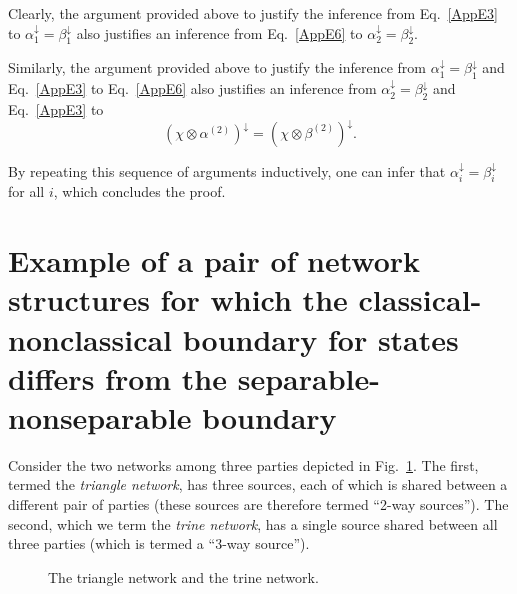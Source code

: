 \documentclass[prx,11pt,letterpaper,twocolumn,accepted=2023-11-27]{quantumarticle}
\newcommand{\bel}{\color{black}}
\theoremstyle{plain}
\theoremstyle{definition}
\begin{document}
\begin{appendices}
Clearly, the argument provided above to justify the inference from Eq.~\eqref{AppE3} to $\alpha^{\downarrow}_1 =\beta^{\downarrow}_1$ also justifies an inference from Eq.~\eqref{AppE6} to $\alpha^{\downarrow}_2 =\beta^{\downarrow}_2$.

Similarly, the argument provided above to justify the inference from $\alpha^{\downarrow}_1 =\beta^{\downarrow}_1$ and Eq.~\eqref{AppE3} to Eq.~\eqref{AppE6} also justifies an inference from $\alpha^{\downarrow}_2 =\beta^{\downarrow}_2$ and Eq.~\eqref{AppE3} to 
\begin{equation}\label{AppE8}
(\chi \otimes \alpha^{(2)})^{\downarrow}= (\chi \otimes \beta^{(2)})^{\downarrow}.
\end{equation}

By repeating this sequence of arguments inductively, one can infer that $\alpha^{\downarrow}_i =\beta^{\downarrow}_i$ for all $i$, which concludes the proof. 

\section{\sloppy Example of a pair of network structures for which the classical-nonclassical boundary for states differs from the separable-nonseparable boundary}\label{ExamplePairStructures}


Consider the two networks among three parties depicted in Fig.~\ref{fig:trine_and_triangle_networks}. The first, termed the {\em triangle network}, has three %
sources, each of which is shared between a different pair of parties (these sources are therefore termed ``2-way sources'').  The second,
 which we term the {\em  trine network}, 
has a single 
 source shared between all three parties (which is termed a ``3-way source'').  
\begin{figure}[htb]
\centering
    \caption{The triangle network and the trine network.}
    \label{fig:trine_and_triangle_networks}
\end{figure}


\end{appendices}
\end{document}
